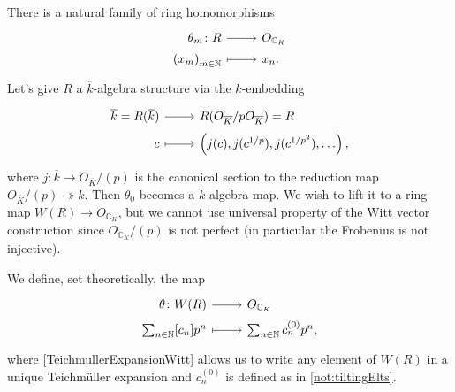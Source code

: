 \begin{rem}[]
	There is a natural family of ring homomorphisms
	\begin{equation*}
	\begin{tikzcd}[row sep = 0ex
		,/tikz/column 1/.append style={anchor=base east}
		,/tikz/column 2/.append style={anchor=base west}]
		\theta_m\colon R \arrow[r, "", rightarrow] &
		O_{\mathbb{C}_K} \\
		\left( x_m \right)_{m \in \mathbb{N}} \arrow[r, "", mapsto] & 
		x_n
	.\end{tikzcd}
	\end{equation*} 
	Let's give $R$ a $\overline{k}$-algebra structure
	via the $k$-embedding
	\begin{equation*}
	\begin{tikzcd}[row sep = 0ex
		,/tikz/column 1/.append style={anchor=base east}
		,/tikz/column 2/.append style={anchor=base west}]
		\overline{k} = R(\overline{k}) \arrow[r, "", rightarrow] &
		R(O_{\overline{K}}/pO_{\overline{K}}) =R\\
		c \arrow[r, "", mapsto] & 
		\left( j(c), j(c^{1/p}), j(c^{1/p^2}), \ldots \right)
	,\end{tikzcd}
	\end{equation*} 
	where $j\colon \overline{k} \to O_{\overline{K}}/ (p)$ is the canonical
	section to the reduction map $O_{\overline{K}}/ (p) \twoheadrightarrow \overline{k}$.
	Then $\theta_0$ becomes a $\overline{k}$-algebra map.
	We wish to lift it to a ring map $W(R) \to O_{\mathbb{C}_K}$,
	but we cannot use universal property of the Witt vector construction
	since $O_{\mathbb{C}_K}/ (p)$ is not perfect (in particular the Frobenius
	is not injective).
\end{rem}


\begin{defn}[]
	We define, set theoretically, the map
	\begin{equation*}
	\begin{tikzcd}[row sep = 0ex
		,/tikz/column 1/.append style={anchor=base east}
		,/tikz/column 2/.append style={anchor=base west}]
		\theta\colon W(R) \arrow[r, "", rightarrow] &
		O_{\mathbb{C}_K} \\
		\sum_{n \in \mathbb{N} }^{  } [c_n] p^n \arrow[r, "", mapsto] & 
		\sum_{n \in \mathbb{N} }^{  } c_n^{(0)} p^n
	,\end{tikzcd}
	\end{equation*} 
	where \cref{TeichmullerExpansionWitt} allows us to write any element of $W(R)$
	in a unique Teichmüller expansion and $c_n^{(0)}$ is defined as in \cref{not:tiltingElts}.
\end{defn}


